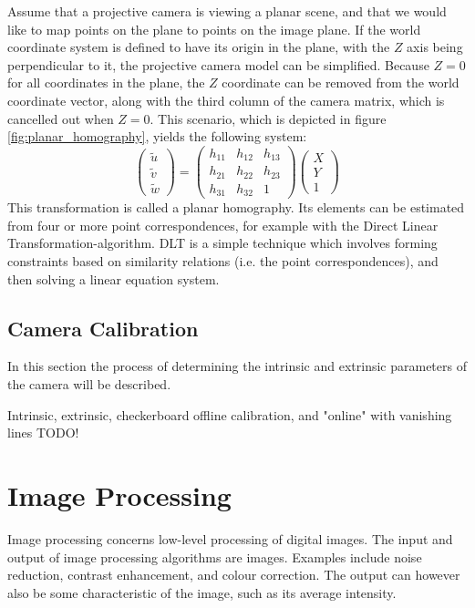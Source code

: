 Assume that a projective camera is viewing a planar scene, and that we would like to map points on the plane to points on the image plane. 
If the world coordinate system is defined to have its origin in the plane, with the $Z$ axis being perpendicular to it, the projective camera model can be simplified. 
Because $Z=0$ for all coordinates in the plane, the $Z$ coordinate can be removed from the world coordinate vector, along with the third column of the camera matrix, which is cancelled out when $Z=0$. 
This scenario, which is depicted in figure \ref{fig:planar_homography}, yields the following system:
$$\begin{pmatrix} \tilde{u} \\ \tilde{v} \\ \tilde{w} \end{pmatrix} =
\begin{pmatrix} h_{11} & h_{12} & h_{13}  \\
 				h_{21} & h_{22} & h_{23}  \\
				h_{31} & h_{32} & 1\end{pmatrix}
\begin{pmatrix}X \\Y \\ 1\end{pmatrix}$$
This transformation is called a planar homography. 
Its elements can be estimated from four or more point correspondences, for example with the Direct Linear Transformation-algorithm.
DLT is a simple technique which involves forming constraints based on similarity relations (i.e. the point correspondences), and then solving a linear equation system.\cite{homography-estimation} %

\subsection{Camera Calibration}
In this section the process of determining the intrinsic and extrinsic parameters of the camera will be described.

Intrinsic, extrinsic, checkerboard offline calibration, and "online" with vanishing lines TODO! %

\section{Image Processing}
Image processing concerns low-level processing of digital images. 
The input and output of image processing algorithms are images. 
Examples include noise reduction, contrast enhancement, and colour correction. 
The output can however also be some characteristic of the image, such as its average intensity.\cite[p. 1-2]{pitas}\cite[p. 1-2]{gonzalez-woods}

